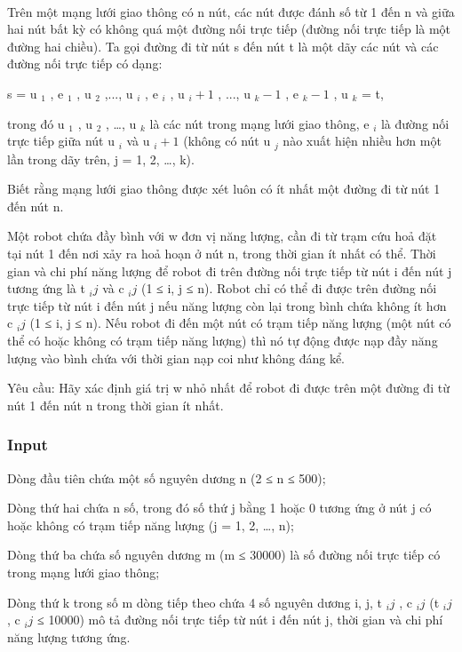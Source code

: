 

 

Trên một mạng lưới giao thông có n nút, các nút được đánh số từ 1 đến n và giữa hai nút bất kỳ có không quá một đường nối trực tiếp (đường nối trực tiếp là một đường hai chiều). Ta gọi đường đi từ nút s đến nút t là một dãy các nút và các đường nối trực tiếp có dạng:

s = u $_ 1 $ , e $_ 1 $ , u $_ 2 $ ,..., u $_ i $ , e $_ i $ , u $_ i+1 $ , ..., u $_ k-1 $ , e $_ k-1 $ , u $_ k $ = t,

trong đó u $_ 1 $ , u $_ 2 $ , …, u $_ k $ là các nút trong mạng lưới giao thông, e $_ i $ là đường nối trực tiếp giữa nút u $_ i $ và u $_ i+1 $ (không có nút u $_ j $ nào xuất hiện nhiều hơn một lần trong dãy trên, j = 1, 2, …, k).

Biết rằng mạng lưới giao thông được xét luôn có ít nhất một đường đi từ nút 1 đến nút n.

Một robot chứa đầy bình với w đơn vị năng lượng, cần đi từ trạm cứu hoả đặt tại nút 1 đến nơi xảy ra hoả hoạn ở nút n, trong thời gian ít nhất có thể. Thời gian và chi phí năng lượng để robot đi trên đường nối trực tiếp từ nút i đến nút j tương ứng là t $_ ij $ và c $_ ij $ (1 ≤ i, j ≤ n). Robot chỉ có thể đi được trên đường nối trực tiếp từ nút i đến nút j nếu năng lượng còn lại trong bình chứa không ít hơn c $_ ij $ (1 ≤ i, j ≤ n). Nếu robot đi đến một nút có trạm tiếp năng lượng (một nút có thể có hoặc không có trạm tiếp năng lượng) thì nó tự động được nạp đầy năng lượng vào bình chứa với thời gian nạp coi như không đáng kể.

Yêu cầu: Hãy xác định giá trị w nhỏ nhất để robot đi được trên một đường đi từ nút 1 đến nút n trong thời gian ít nhất.

\subsubsection{Input}

Dòng đầu tiên chứa một số nguyên dương n (2 ≤ n ≤ 500);

Dòng thứ hai chứa n số, trong đó số thứ j bằng 1 hoặc 0 tương ứng ở nút j có hoặc không có trạm tiếp năng lượng (j = 1, 2, …, n);

Dòng thứ ba chứa số nguyên dương m (m ≤ 30000) là số đường nối trực tiếp có trong mạng lưới giao thông;

Dòng thứ k trong số m dòng tiếp theo chứa 4 số nguyên dương i, j, t $_ ij $ , c $_ ij $ (t $_ ij $ , c $_ ij $ ≤ 10000) mô tả đường nối trực tiếp từ nút i đến nút j, thời gian và chi phí năng lượng tương ứng.


